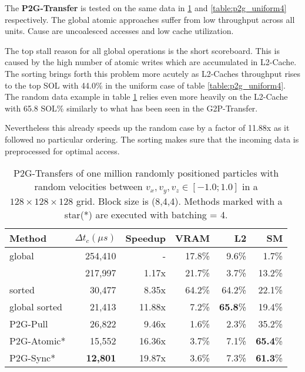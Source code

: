 \documentclass[m,times]{cgMA}
\begin{document}
The \textbf{P2G-Transfer} is tested on the same data in \ref{table:p2g_random} and \ref{table:p2g_uniform4} respectively. The global atomic approaches suffer from low throughput across all units. Cause are uncoalesced accesses and low cache utilization.

The top stall reason for all global operations is the short scoreboard. This is caused by the high number of atomic writes which are accumulated in L2-Cache. The sorting brings forth this problem more acutely as L2-Caches throughput rises to the top SOL with 44.0\% in the uniform case of table \ref{table:p2g_uniform4}. The random data example in table \ref{table:p2g_random} relies even more heavily on the L2-Cache with 65.8 SOL\% similarly to what has been seen in the G2P-Transfer.

Nevertheless this already speeds up the random case by a factor of 11.88x as it followed no particular ordering. The sorting makes sure that the incoming data is preprocessed for optimal access.

\begin{table}[htpb]
  \begin{tabular}{ | l | r | r | r | r | r |}    \hline
    Method                 &  $\Delta t_c(\mu s)$ &Speedup         &VRAM  & L2   &SM    \\\hline
    global                 &  254,410             &-               &17.8\%&9.6\% &1.7\%  \\\hline
    \cite{Meyer2015}       &  217,997             &1.17x           &21.7\%&3.7\% &13.2\% \\\hline
    \cite{Meyer2015} sorted&   30,477		  &8.35x           &64.2\%&64.2\%&22.1\% \\\hline
    global sorted          &   21,413		  &11.88x          &7.2\% &\textbf{65.8}\%&19.4\% \\\hline
    \hline
    P2G-Pull               &   26,822             &9.46x           &1.6\% &2.3\% &35.2\%\\\hline
    P2G-Atomic*		   &   15,552             &16.36x          &3.7\% &7.1\% &\textbf{65.4}\%\\\hline
    P2G-Sync*              &   \textbf{12,801}    &19.87x          &3.6\% &7.3\% &\textbf{61.3}\%\\\hline
 \end{tabular}
 \caption{P2G-Transfers of one million randomly positioned particles with random velocities between $v_x,v_y,v_z \in [-1.0;1.0]$ in a $128\times 128\times128$ grid. Block size is (8,4,4). Methods marked with a star(*) are executed with batching = 4.}\label{table:p2g_random}
\end{table}
\end{document}
